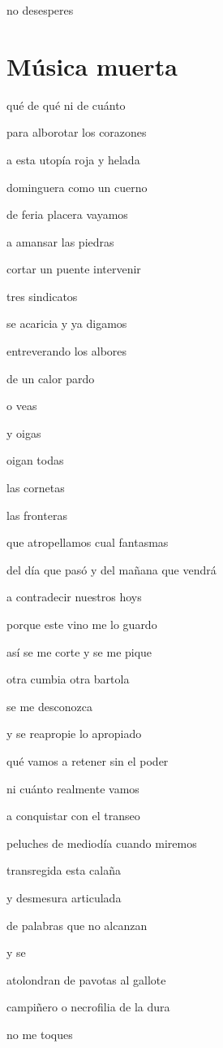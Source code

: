 \documentclass[
]{book}
\begin{document}
no desesperes

\hypertarget{muxfasica-muerta}{%
\chapter{Música muerta}\label{muxfasica-muerta}}

qué de qué ni de cuánto

para alborotar los corazones

a esta utopía roja y helada

dominguera como un cuerno

de feria placera vayamos

a amansar las piedras

cortar un puente intervenir

tres sindicatos

se acaricia y ya digamos

entreverando los albores

de un calor pardo

o veas

y oigas

oigan todas

las cornetas

las fronteras

que atropellamos cual fantasmas

del día que pasó y del mañana que vendrá

a contradecir nuestros hoys

porque este vino me lo guardo

así se me corte y se me pique

otra cumbia otra bartola

se me desconozca

y se reapropie lo apropiado

qué vamos a retener sin el poder

ni cuánto realmente vamos

a conquistar con el transeo

peluches de mediodía cuando miremos

transregida esta calaña

y desmesura articulada

de palabras que no alcanzan

y se

atolondran de pavotas al gallote

campiñero o necrofilia de la dura

no me toques
\end{document}
